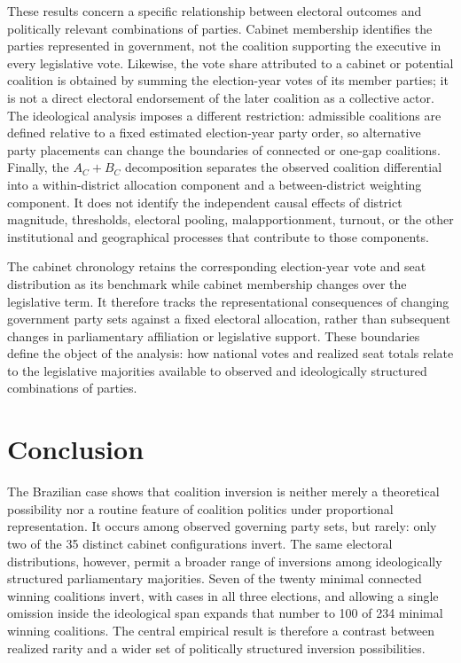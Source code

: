 \documentclass[11pt]{article}
\begin{document}
These results concern a specific relationship between electoral outcomes and
politically relevant combinations of parties. Cabinet membership identifies
the parties represented in government, not the coalition supporting the
executive in every legislative vote. Likewise, the vote share attributed to
a cabinet or potential coalition is obtained by summing the election-year
votes of its member parties; it is not a direct electoral endorsement of the
later coalition as a collective actor. The ideological analysis imposes a
different restriction: admissible coalitions are defined relative to a fixed
estimated election-year party order, so alternative party placements can
change the boundaries of connected or one-gap coalitions. Finally, the
\(A_C+B_C\) decomposition separates the observed coalition differential
into a within-district allocation component and a between-district weighting
component. It does not identify the independent causal effects of district
magnitude, thresholds, electoral pooling, malapportionment, turnout, or the
other institutional and geographical processes that contribute to those
components.

The cabinet chronology retains the corresponding election-year vote and
seat distribution as its benchmark while cabinet membership changes over
the legislative term. It therefore tracks the representational consequences
of changing government party sets against a fixed electoral allocation,
rather than subsequent changes in parliamentary affiliation or legislative
support. These boundaries define the object of the analysis: how national
votes and realized seat totals relate to the legislative majorities available
to observed and ideologically structured combinations of parties.



\section{Conclusion}

The Brazilian case shows that coalition inversion is neither merely a
theoretical possibility nor a routine feature of coalition politics under
proportional representation. It occurs among observed governing party sets,
but rarely: only two of the 35 distinct cabinet configurations invert. The
same electoral distributions, however, permit a broader range of inversions
among ideologically structured parliamentary majorities. Seven of the twenty
minimal connected winning coalitions invert, with cases in all three
elections, and allowing a single omission inside the ideological span
expands that number to 100 of 234 minimal winning coalitions. The central
empirical result is therefore a contrast between realized rarity and a wider
set of politically structured inversion possibilities.
\end{document}
